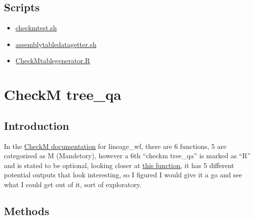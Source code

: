 \documentclass[
  letterpaper,
  DIV=11,
  numbers=noendperiod]{scrreprt}
\begin{document}
\subsection{Scripts}\label{scripts}

\begin{itemize}
\item
  \href{https://github.com/tobiasnunn/tnunn_research/blob/6be0be8a1de6b7fd64de79c280d9641f68a0e37c/00_scripts/checkmtest.sh}{checkmtest.sh}
\item
  \href{https://github.com/tobiasnunn/tnunn_research/blob/6be0be8a1de6b7fd64de79c280d9641f68a0e37c/00_scripts/assemblytabledatagetter.sh}{assemblytabledatagetter.sh}
\item
  \href{https://github.com/tobiasnunn/tnunn_research/blob/60126045c5802ef0627e86df57e7b533ff568e9d/00_scripts/CheckMtablegenerator.R}{CheckMtablegenerator.R}
\end{itemize}

\section{CheckM tree\_qa}\label{checkm-tree_qa}

\subsection{Introduction}\label{introduction-4}

In the
\href{https://github.com/Ecogenomics/CheckM/wiki/Workflows\#lineage-specific-workflow}{CheckM
documentation} for lineage\_wf, there are 6 functions, 5 are categorised
as M (Mandetory), however a 6th ``checkm tree\_qa'' is marked as ``R''
and is stated to be optional, looking closer at
\href{https://github.com/Ecogenomics/CheckM/wiki/Genome-Quality-Commands\#tree_qa}{this
function,} it has 5 different potential outputs that look interesting,
so I figured I would give it a go and see what I could get out of it,
sort of exploratory.

\subsection{Methods}\label{methods-2}
\end{document}
